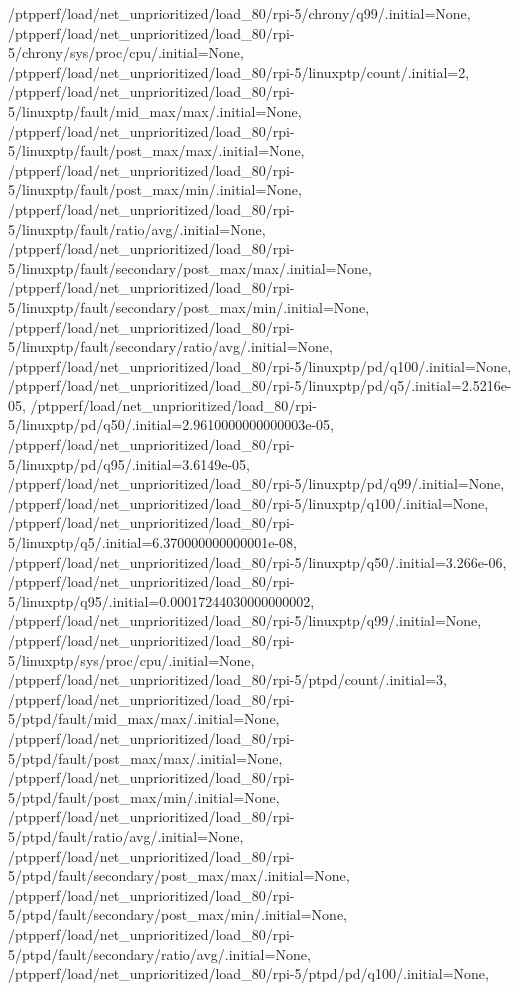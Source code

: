 {    /ptpperf/load/net_unprioritized/load_80/rpi-5/chrony/q99/.initial=None,
    /ptpperf/load/net_unprioritized/load_80/rpi-5/chrony/sys/proc/cpu/.initial=None,
    /ptpperf/load/net_unprioritized/load_80/rpi-5/linuxptp/count/.initial=2,
    /ptpperf/load/net_unprioritized/load_80/rpi-5/linuxptp/fault/mid_max/max/.initial=None,
    /ptpperf/load/net_unprioritized/load_80/rpi-5/linuxptp/fault/post_max/max/.initial=None,
    /ptpperf/load/net_unprioritized/load_80/rpi-5/linuxptp/fault/post_max/min/.initial=None,
    /ptpperf/load/net_unprioritized/load_80/rpi-5/linuxptp/fault/ratio/avg/.initial=None,
    /ptpperf/load/net_unprioritized/load_80/rpi-5/linuxptp/fault/secondary/post_max/max/.initial=None,
    /ptpperf/load/net_unprioritized/load_80/rpi-5/linuxptp/fault/secondary/post_max/min/.initial=None,
    /ptpperf/load/net_unprioritized/load_80/rpi-5/linuxptp/fault/secondary/ratio/avg/.initial=None,
    /ptpperf/load/net_unprioritized/load_80/rpi-5/linuxptp/pd/q100/.initial=None,
    /ptpperf/load/net_unprioritized/load_80/rpi-5/linuxptp/pd/q5/.initial=2.5216e-05,
    /ptpperf/load/net_unprioritized/load_80/rpi-5/linuxptp/pd/q50/.initial=2.9610000000000003e-05,
    /ptpperf/load/net_unprioritized/load_80/rpi-5/linuxptp/pd/q95/.initial=3.6149e-05,
    /ptpperf/load/net_unprioritized/load_80/rpi-5/linuxptp/pd/q99/.initial=None,
    /ptpperf/load/net_unprioritized/load_80/rpi-5/linuxptp/q100/.initial=None,
    /ptpperf/load/net_unprioritized/load_80/rpi-5/linuxptp/q5/.initial=6.370000000000001e-08,
    /ptpperf/load/net_unprioritized/load_80/rpi-5/linuxptp/q50/.initial=3.266e-06,
    /ptpperf/load/net_unprioritized/load_80/rpi-5/linuxptp/q95/.initial=0.00017244030000000002,
    /ptpperf/load/net_unprioritized/load_80/rpi-5/linuxptp/q99/.initial=None,
    /ptpperf/load/net_unprioritized/load_80/rpi-5/linuxptp/sys/proc/cpu/.initial=None,
    /ptpperf/load/net_unprioritized/load_80/rpi-5/ptpd/count/.initial=3,
    /ptpperf/load/net_unprioritized/load_80/rpi-5/ptpd/fault/mid_max/max/.initial=None,
    /ptpperf/load/net_unprioritized/load_80/rpi-5/ptpd/fault/post_max/max/.initial=None,
    /ptpperf/load/net_unprioritized/load_80/rpi-5/ptpd/fault/post_max/min/.initial=None,
    /ptpperf/load/net_unprioritized/load_80/rpi-5/ptpd/fault/ratio/avg/.initial=None,
    /ptpperf/load/net_unprioritized/load_80/rpi-5/ptpd/fault/secondary/post_max/max/.initial=None,
    /ptpperf/load/net_unprioritized/load_80/rpi-5/ptpd/fault/secondary/post_max/min/.initial=None,
    /ptpperf/load/net_unprioritized/load_80/rpi-5/ptpd/fault/secondary/ratio/avg/.initial=None,
    /ptpperf/load/net_unprioritized/load_80/rpi-5/ptpd/pd/q100/.initial=None,
}
